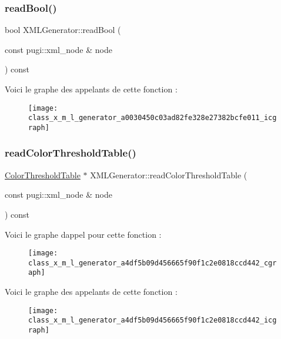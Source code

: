 \subsubsection{\texorpdfstring{read\+Bool()}{readBool()}}
{\footnotesize\ttfamily bool X\+M\+L\+Generator\+::read\+Bool (\begin{DoxyParamCaption}\item[{const pugi\+::xml\+\_\+node \&}]{node }\end{DoxyParamCaption}) const\hspace{0.3cm}{\ttfamily [private]}}

Voici le graphe des appelants de cette fonction \+:\nopagebreak
\begin{figure}[H]
\begin{center}
\leavevmode
\texttt{[image: class\_x\_m\_l\_generator\_a0030450c03ad82fe328e27382bcfe011\_icgraph]}
\end{center}
\end{figure}
\mbox{\label{class_x_m_l_generator_a4df5b09d456665f90f1c2e0818ccd442}} 
\subsubsection{\texorpdfstring{read\+Color\+Threshold\+Table()}{readColorThresholdTable()}}
{\footnotesize\ttfamily \hyperlink{thresholdtable_8h_ab0deb49d07758f9814993774cb9935cc}{Color\+Threshold\+Table} $\ast$ X\+M\+L\+Generator\+::read\+Color\+Threshold\+Table (\begin{DoxyParamCaption}\item[{const pugi\+::xml\+\_\+node \&}]{node }\end{DoxyParamCaption}) const\hspace{0.3cm}{\ttfamily [private]}}

Voici le graphe d\textquotesingle{}appel pour cette fonction \+:\nopagebreak
\begin{figure}[H]
\begin{center}
\leavevmode
\texttt{[image: class\_x\_m\_l\_generator\_a4df5b09d456665f90f1c2e0818ccd442\_cgraph]}
\end{center}
\end{figure}
Voici le graphe des appelants de cette fonction \+:\nopagebreak
\begin{figure}[H]
\begin{center}
\leavevmode
\texttt{[image: class\_x\_m\_l\_generator\_a4df5b09d456665f90f1c2e0818ccd442\_icgraph]}
\end{center}
\end{figure}
\mbox{\label{class_x_m_l_generator_ab0a3198e6d44dcf102e13902325e0bd1}} 
